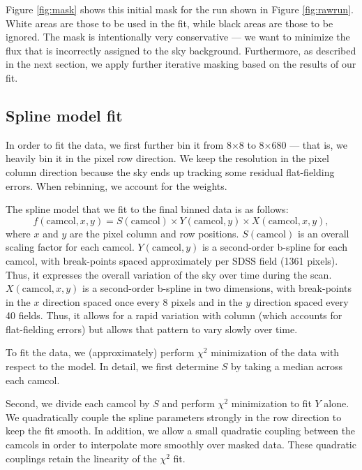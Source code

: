 \documentclass[10pt,preprint]{aastex}
\begin{document}
Figure \ref{fig:mask} shows this initial mask for the run shown in
Figure \ref{fig:rawrun}. White areas are those to be used in the fit,
while black areas are those to be ignored. The mask is intentionally
very conservative --- we want to minimize the flux that is incorrectly
assigned to the sky background. Furthermore, as described in the next
section, we apply further iterative masking based on the results of
our fit.

\subsection{Spline model fit}
\label{sec:spline}

In order to fit the data, we first further bin it from 8$\times$8 to
8$\times$680 --- that is, we heavily bin it in the pixel row
direction.  We keep the resolution in the pixel column direction
because the sky ends up tracking some residual flat-fielding
errors. When rebinning, we account for the weights.

The spline model that we fit to the final binned data is as follows:
\begin{equation}
\label{skyspline}
    f(\mathrm{camcol}, x, y) = S(\mathrm{camcol}) \times
    Y(\mathrm{camcol}, y) \times X(\mathrm{camcol}, x, y),
\end{equation}
where $x$ and $y$ are the pixel column and row positions.
$S(\mathrm{camcol})$ is an overall scaling factor for each
camcol. $Y(\mathrm{camcol}, y)$ is a second-order b-spline for each
camcol, with break-points spaced approximately per SDSS field (1361
pixels). Thus, it expresses the overall variation of the sky over time
during the scan.  $X(\mathrm{camcol}, x, y)$ is a second-order
b-spline in two dimensions, with break-points in the $x$ direction
spaced once every 8 pixels and in the $y$ direction spaced every 40
fields. Thus, it allows for a rapid variation with column (which
accounts for flat-fielding errors) but allows that pattern to vary
slowly over time.

To fit the data, we (approximately) perform $\chi^2$ minimization of
the data with respect to the model. In detail, we first determine $S$
by taking a median across each camcol.

Second, we divide each camcol by $S$ and perform $\chi^2$ minimization
to fit $Y$ alone. We quadratically couple the spline parameters
strongly in the row direction to keep the fit smooth. In addition, we
allow a small quadratic coupling between the camcols in order to
interpolate more smoothly over masked data. These quadratic couplings
retain the linearity of the $\chi^2$ fit.
\end{document}
